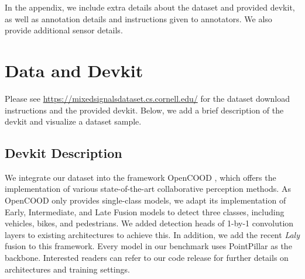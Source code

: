 \clearpage
\setcounter{page}{1}
\maketitlesupplementary

\renewcommand{\thetable}{S\arabic{table}}
\renewcommand{\thefigure}{S\arabic{figure}}
\renewcommand{\theequation}{S\arabic{equation}}
\setcounter{figure}{0}
\setcounter{table}{0}
\setcounter{equation}{0}

\noindent
In the appendix, we include extra details about the dataset and provided devkit, as well as annotation details and instructions given to annotators. We also provide additional sensor details.



\section{Data and Devkit}
Please see \url{https://mixedsignalsdataset.cs.cornell.edu/} for the dataset download instructions and the provided devkit. Below, we add a brief description of the devkit and visualize a dataset sample.

\subsection{Devkit Description}
We integrate our dataset into the framework OpenCOOD \cite{xu2022opv2v}, which offers the implementation of various state-of-the-art collaborative perception methods. 
As OpenCOOD only provides single-class models, we adapt its implementation of Early, Intermediate, and Late Fusion models to detect three classes, including vehicles, bikes, and pedestrians.
We added detection heads of 1-by-1 convolution layers to existing architectures to achieve this.
In addition, we add the recent \textit{Laly} fusion \cite{dao2024practical} to this framework.
Every model in our benchmark uses PointPillar \cite{lang2019pointpillars} as the backbone.
Interested readers can refer to our code release for further details on architectures and training settings. 

